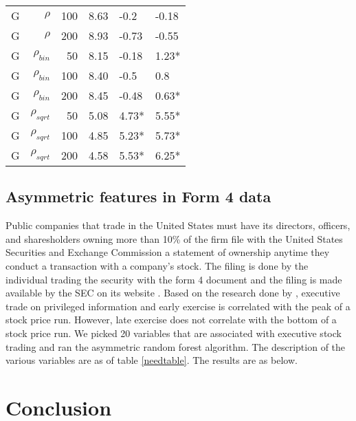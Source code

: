\documentclass[twoside,11pt]{article}
\begin{document}
\begin{table}
\begin{tabular}{rrrp{2.5cm}p{2.5cm}p{2.5cm}}
G     & $\rho$ & 100   & 8.63  & -0.2  & -0.18 \\
G     & $\rho$ & 200   & 8.93  & -0.73 & -0.55 \\
G     & $\rho_{bin}$ & 50    & 8.15  & -0.18 & 1.23* \\
G     & $\rho_{bin}$ & 100   & 8.40  & -0.5  & 0.8 \\
G     & $\rho_{bin}$ & 200   & 8.45  & -0.48 & 0.63* \\
G     & $\rho_{sqrt}$ & 50    & 5.08  & 4.73* & 5.55* \\
G     & $\rho_{sqrt}$ & 100   & 4.85  & 5.23* & 5.73* \\
G     & $\rho_{sqrt}$ & 200   & 4.58  & 5.53* & 6.25* \bigstrut[b]\\
\hline
\end{tabular}%
\label{tab:asymmetricfeaturesresults2}%
\end{table}%


\subsection{Asymmetric features in Form 4 data}
Public companies that trade in the United States must have its directors, officers, and sharesholders owning more than 10\% of the firm file with the United States Securities and Exchange Commission a statement of ownership anytime they conduct a transaction with a company's stock. The filing is done by the individual trading the security with the form 4 document and the filing is made available by the SEC on its website \citep{SECWebsite}. Based on the research done by \citet{Cicero09}, executive trade on privileged information and early exercise is correlated with the peak of a stock price run. However, late exercise does not correlate with the bottom of a stock price run. We picked 20 variables that are associated with executive stock trading and ran the asymmetric random forest algorithm. The description of the various variables are as of table \ref{needtable}. The results are as below.  


\section{Conclusion}



\end{document}

